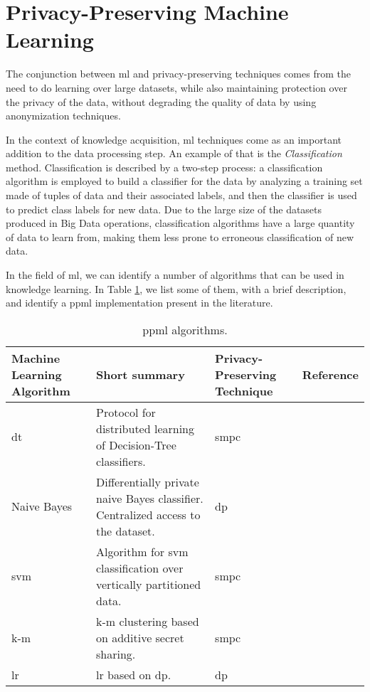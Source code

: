\section{Privacy-Preserving Machine Learning}
\label{sec:PrivacyPreservingMachineLearning}

The conjunction between \ac{ml} and privacy-preserving techniques comes from the need to do learning over large datasets, while also maintaining protection over the privacy of the data, without degrading the quality of data by using anonymization techniques.

In the context of knowledge acquisition, \ac{ml} techniques come as an important addition to the data processing step. An example of that is the \textit{Classification} method. Classification is described by a two-step process: a classification algorithm is employed to build a classifier for the data by analyzing a training set made of tuples of data and their associated labels, and then the classifier is used to predict class labels for new data. Due to the large size of the datasets produced in Big Data operations, classification algorithms have a large quantity of data to learn from, making them less prone to erroneous classification of new data.


In the field of \ac{ml}, we can identify a number of algorithms that can be used in knowledge learning. In Table \ref{table:ppml1}, we list some of them, with a brief description, and identify a \ac{ppml} implementation present in the literature.

\begin{table}[htp]
\centering
\caption{\ac{ppml} algorithms.}
\label{table:ppml1}
\vspace*{0.2cm}
\begin{tabular}{|p{2.3cm}|p{5cm}|p{3.7cm}|l|}
\hline
\textbf{Machine Learning Algorithm} & \textbf{Short summary} & \textbf{Privacy-Preserving Technique} 
& \textbf{Reference} \\ \hline
\acs{dt} & Protocol for distributed learning of Decision-Tree classifiers. & \ac{smpc} & \cite{brickell2009privacy} \\ \hline
Naive Bayes & Differentially private naive Bayes classifier. Centralized access to the dataset. & \ac{dp} &\cite{vaidya2013differentially} \\ \hline
\acs{svm}  &Algorithm for \acl{svm} classification over vertically partitioned data. & \ac{smpc} & \cite{yu2006privacy} \\ \hline
\acs{k-m} & \acl{k-m} clustering based on additive secret sharing. & \ac{smpc}  & \cite{doganay2008distributed} \\\hline
\acs{lr} & \acl{lr} based on \acl{dp}.    &  \ac{dp} & \cite{chaudhuri2009privacy} \\\hline
\end{tabular}
\end{table}


